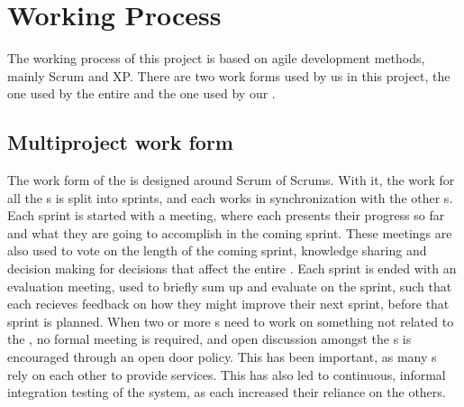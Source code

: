 \section{Working Process}
The working process of this project is based on agile development methods, mainly Scrum and XP. 
There are two work forms used by us in this project, the one used by the entire \globalgroup{} and the one used by our \localgroup{}. 

\subsection{Multiproject work form}
The work form of the \globalgroup{} is designed around Scrum of Scrums. 
With it, the work for all the \localgroup{}s is split into sprints, and each \localgroup{} works in synchronization with the other \localgroup{}s. 
Each sprint is started with a meeting, where each \localgroup{} presents their progress so far and what they are going to accomplish in the coming sprint. 
These meetings are also used to vote on the length of the coming sprint, knowledge sharing and decision making for decisions that affect the entire \globalgroup{}. \newline
Each sprint is ended with an evaluation meeting, used to briefly sum up and evaluate on the sprint, such that each \localgroup{} recieves feedback on how they might improve their next sprint, before that sprint is planned. 
When two or more \localgroup{}s need to work on something not related to the \globalgroup{}, no formal meeting is required, and open discussion amongst the \localgroup{}s is encouraged through an open door policy. 
This has been important, as many \localgroup{}s rely on each other to provide services. 
This has also led to continuous, informal integration testing of the system, as each \localgroup{} increased their reliance on the others. 

